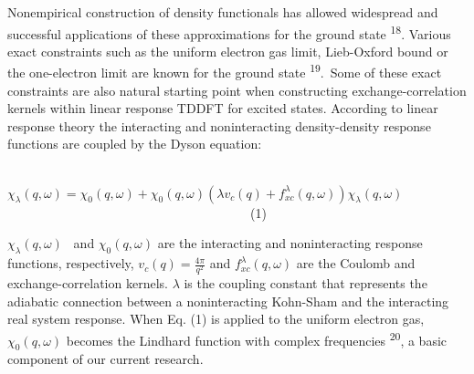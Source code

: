\documentclass[12pt]{article}
\renewcommand{\_}{\kern-1.5pt\textunderscore\kern-1.5pt}
\begin{document}
\vspace{\baselineskip}
\setlength{\parskip}{9.96pt}
\setlength{\parskip}{0.0pt}
\begin{justify}
Nonempirical construction of density functionals has allowed widespread and successful applications of these approximations for the ground state \textsuperscript{18}. Various exact constraints such as the uniform electron gas limit, Lieb-Oxford bound or the one-electron limit are known for the ground state \textsuperscript{19}.\ Some of these exact constraints are also natural starting point when constructing exchange-correlation kernels within linear response TDDFT for excited states.  According to linear response theory the interacting and noninteracting density-density response functions are coupled by the Dyson equation:
\end{justify}\par


\vspace{\baselineskip}
\setlength{\parskip}{9.96pt}
\setlength{\parskip}{0.0pt}
\begin{Center}
\ \ \ \ \ \ \ \ \ \ \ \ \ \ \ \   \(  \chi _{ \lambda } \left( q, \omega  \right) =  \chi _{0} \left( q, \omega  \right) + \chi _{0} \left( q, \omega  \right)  \left(  \lambda v_{c} \left( q \right) +f_{xc}^{ \lambda } \left( q, \omega  \right)  \right)  \chi _{ \lambda } \left( q, \omega  \right)  \) \ \ \ \ \ \ \ \ \ \ \ \ \ \ \ \ \ \ \ \ \ \ \ \ \ \ \ \ \ \ \ \ \ \ \ \ \ \  (1)
\end{Center}\par


\vspace{\baselineskip}
\setlength{\parskip}{9.96pt}

\vspace{\baselineskip}
\setlength{\parskip}{0.0pt}
\setlength{\parskip}{9.96pt}
\setlength{\parskip}{0.0pt}
\begin{justify}
 \(  \chi _{ \lambda } \left( q, \omega  \right)  \) \ and   \(  \chi _{0} \left( q, \omega  \right)  \)  are the interacting and noninteracting response functions, respectively,  \( v_{c} \left( q \right) =\frac{4 \pi }{q^{2}} \)  and  \( f_{xc}^{ \lambda } \left( q, \omega  \right)  \)  are the Coulomb and exchange-correlation kernels. $ \lambda $  is the coupling constant that represents the adiabatic connection between a noninteracting Kohn-Sham and the interacting real system response. When Eq. (1) is applied to the uniform electron gas,  \(  \chi _{0} \left( q, \omega  \right)  \)  becomes the Lindhard function with complex frequencies \textsuperscript{20}, a basic component of our current research. 
\end{justify}\par
\end{document}
